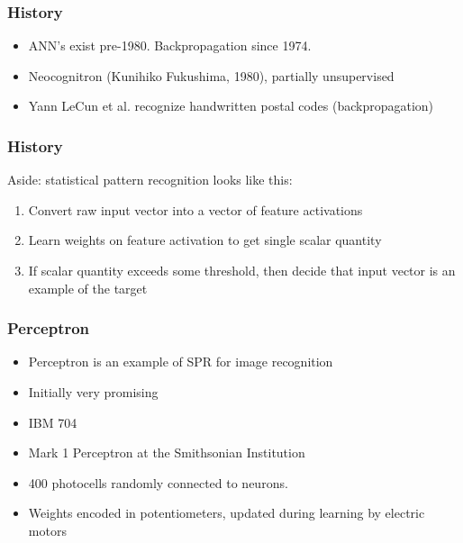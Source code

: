 \begin{frame}
  \frametitle{History}
  \begin{itemize}
  \item<1-> ANN's exist pre-1980.  Backpropagation since 1974.
  \item<2-> Neocognitron (Kunihiko Fukushima, 1980), partially unsupervised
  \item<3-> Yann LeCun et al. recognize handwritten postal codes (backpropagation)
  \end{itemize}
  
  
  
\end{frame}

\begin{frame}
  \frametitle{History}
  Aside: statistical pattern recognition looks like this:
  \begin{enumerate}
  \item Convert raw input vector into a vector of feature activations 
  \item Learn weights on feature activation to get single scalar quantity
  \item If scalar quantity exceeds some threshold, then decide that
    input vector is an example of the target
  \end{enumerate}
\end{frame}

\begin{frame}
  \frametitle{Perceptron}
  \begin{itemize}
  \item Perceptron is an example of SPR for image recognition
  \item Initially very promising
  \item<2> IBM 704 \\[3mm]
  \item<2> Mark 1 Perceptron at the Smithsonian Institution
  \item<2> 400 photocells randomly connected to neurons.
  \item<2> Weights encoded in potentiometers, updated during learning
    by electric motors
  \end{itemize}
\end{frame}

